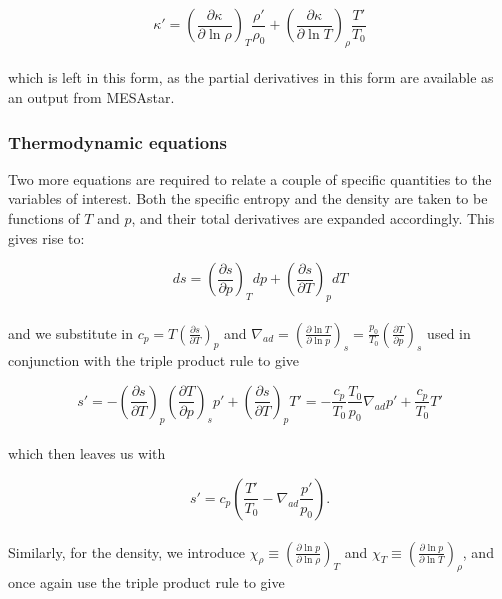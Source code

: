 \documentclass[11pt]{amsart}
\begin{document}
\begin{equation}
\kappa' = \left( \frac{\partial \kappa}{\partial \ln \rho} \right)_{T} \frac{\rho'}{\rho_{0}} + \left( \frac{\partial \kappa}{\partial \ln T} \right)_{\rho} \frac{T'}{T_{0}}
\end{equation}
\\
which is left in this form, as the partial derivatives in this form are available as an output from MESAstar.



\subsubsection{Thermodynamic equations}

Two more equations are required to relate a couple of specific quantities to the variables of interest.
Both the specific entropy and the density are taken to be functions of $T$ and $p$, and their total derivatives
are expanded accordingly.  This gives rise to:

\begin{equation}
ds = \left( \frac{\partial s}{\partial p} \right)_{T} dp +\left( \frac{\partial s}{\partial T} \right)_{p} dT
\end{equation} 
\\
and we substitute in $c_{p} = T \left( \frac{\partial s}{\partial T} \right)_{p}$ and 
$\nabla_{ad} = \left( \frac{\partial \ln T}{\partial \ln p} \right)_{s} = \frac{p_{0}}{T_{0}} \left( \frac{\partial T}{\partial p} \right)_{s}$ used in conjunction with
the triple product rule to give

\begin{equation}
s' = - \left( \frac{\partial s}{\partial T} \right)_{p} \left( \frac{\partial T}{\partial p} \right)_{s} p' +\left( \frac{\partial s}{\partial T} \right)_{p} T'
= - \frac{c_{p}}{T_{0}} \frac{T_{0}}{p_{0}} \nabla_{ad} p' + \frac{c_{p}}{T_{0}} T'
\end{equation} 
\\
which then leaves us with

\begin{equation}
s' = c_{p} \left( \frac{T'}{T_{0}} - \nabla_{ad} \frac{p'}{p_{0}} \right).
\end{equation} 
\\
Similarly, for the density, we introduce $\chi_{\rho} \equiv \left( \frac{\partial \ln p}{\partial \ln \rho} \right)_{T}$
 and $\chi_{T} \equiv \left( \frac{\partial \ln p}{\partial \ln T} \right)_{\rho}$, and once again use the 
 triple product rule to give
 
\end{document}
